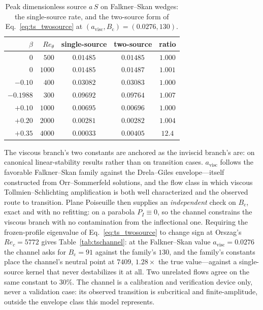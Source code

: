 \begin{table}[tp]
  \centering\small
  \caption{Peak dimensionless source $a\,S$ on Falkner--Skan wedges: the
  single-source rate, and the two-source form of
  Eq.~\eqref{eq:ts_twosource} at
  $(a_{\mathrm{visc}},B_{\mathrm c})=(0.0276,130)$.}
  \label{tab:tsfamily}
  \begin{tabular}{rrccc}
    \toprule
    $\beta$ & $Re_\theta$ & single-source & two-source & ratio\\
    \midrule
    $0$        & $500$  & $0.01485$ & $0.01485$ & $1.000$\\
    $0$        & $1000$ & $0.01485$ & $0.01487$ & $1.001$\\
    $-0.10$    & $400$  & $0.03082$ & $0.03083$ & $1.000$\\
    $-0.1988$  & $300$  & $0.09692$ & $0.09764$ & $1.007$\\
    $+0.10$    & $1000$ & $0.00695$ & $0.00696$ & $1.000$\\
    $+0.20$    & $2000$ & $0.00281$ & $0.00282$ & $1.004$\\
    $+0.35$    & $4000$ & $0.00033$ & $0.00405$ & $12.4$\\
    \bottomrule
  \end{tabular}
\end{table}

The viscous branch's two constants are anchored as the inviscid branch's
are: on canonical linear-stability results rather than on transition cases.
$a_{\mathrm{visc}}$ follows the favorable Falkner--Skan family against the
Drela--Giles envelope---itself constructed from Orr--Sommerfeld solutions,
and the flow class in which viscous Tollmien--Schlichting amplification is
both well characterized and the observed route to transition. Plane
Poiseuille then supplies an \emph{independent} check on $B_{\mathrm c}$,
exact and with no refitting: on a parabola $P_I\equiv0$, so the channel
constrains the viscous branch with no contamination from the inflectional
one. Requiring the frozen-profile eigenvalue of
Eq.~\eqref{eq:ts_twosource} to change sign at Orszag's $Re_c=5772$ gives
Table~\ref{tab:tschannel}: at the Falkner--Skan value
$a_{\mathrm{visc}}=0.0276$ the channel asks for $B_{\mathrm c}=91$ against
the family's $130$, and the family's constants place the channel's neutral
point at $7409$, $1.28\times$ the true value---against a single-source
kernel that never destabilizes it at all. Two unrelated flows agree on the
same constant to $30\%$. The channel is a calibration and verification
device only, never a validation case: its observed transition is subcritical
and finite-amplitude, outside the envelope class this model represents.

